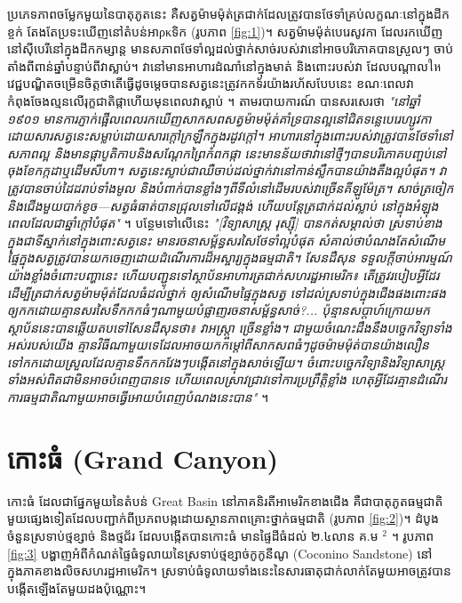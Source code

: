 \documentclass[10pt,twocolumn,letterpaper]{article}
\begin{document}
ប្រភេទភាពចម្លែកមួយនៃបាតុភូតនេះ គឺសត្វម៉ាមម៉ុត់ត្រជាក់ដែលត្រូវបានថែទាំគ្រប់លក្ខណៈនៅក្នុងដីកខ្ចក់ តែងតែប្រទះឃើញនៅតំបន់អាρκទិក (រូបភាព \ref{fig:1})។ សត្វម៉ាមម៉ុត់បេរេសូវកា ដែលរកឃើញនៅស៊ីបេរីនៅក្នុងដីកកម្សាន្ត មានសភាពថែទាំល្អដល់ថ្នាក់សាច់របស់វានៅអាចបរិភោគបានស្រួលៗ ចាប់តាំងពីពាន់ឆ្នាំបន្ទាប់ពីវាស្លាប់។ វានៅមានអាហារដំណាំនៅក្នុងមាត់ និងពោះរបស់វា ដែលបណ្ដាលให​វេជ្ជបណ្ឌិតចម្រេីនចិត្តថាតើធ្វើដូចម្តេចបានសត្វនេះត្រូវកកទ័រយ៉ាងរហ័សបែបនេះ ខណៈពេលវាកំពុងចែងល្មនលើរុក្ខជាតិផ្កាហើយមុនពេលវាស្លាប់ \cite{17}។ តាមរបាយការណ៍ បានសរសេរថា \textit{"នៅឆ្នាំ ១៩០១ មានការភ្ញាក់ផ្អើលពេលរកឃើញសាកសពសត្វម៉ាមម៉ុត់គាំទ្របានល្អនៅជិតទន្លេបេរេហ្សូវកា ដោយសារសត្វនេះសម្លាប់ដោយសារក្តៅក្រឡឹកក្នុងរដូវក្តៅ។ អាហារនៅក្នុងពោះរបស់វាត្រូវបានថែទាំនៅសភាពល្អ និងមានផ្កាបូតិកាបនិងសណ្តែកព្រៃកំពកផ្កា នេះមានន័យថាវានៅថ្មីៗបានបរិភោគបញ្ចប់នៅចុងខែកក្កដាឬដើមសីហា។ សត្វនេះស្លាប់ជាឈឺចាប់ដល់ថ្នាក់វានៅកាន់ស្លឹកបានយ៉ាងតឹងល្អបំផុត។ វាត្រូវបានចាប់ដៃដរាប់ទាំងមូល និងបំពាក់បានខ្លាំងៗពីទីលំនៅដើមរបស់វាច្រើនគីឡូម៉ែត្រ។ សាច់ត្រចៀកនិងជើងមួយបាក់ខូច—សត្វធំធាត់បានជ្រុលទៅលើជង្គង់ ហើយបន្តែត្រជាក់ដល់ស្លាប់ នៅក្នុងអំឡុងពេលដែលជាឆ្នាំក្តៅបំផុត"} \cite{18}។ បន្ថែមទៅលើនេះ \textit{"[វិទ្យាសាស្ត្រ​ រុស្ស៊ី] បានកត់សម្គាល់ថា ស្រទាប់ខាងក្នុងជាទីស្នាក់នៅក្នុងពោះសត្វនេះ មានរចនាសម្ព័ន្ធសរសៃថែទាំល្អបំផុត សំគាល់ថាបំណងតែសំណើមផ្ទៃក្នុងសត្វត្រូវបានយកចេញដោយដំណើរការដ៏អស្ចារ្យក្នុងធម្មជាតិ។ សែនដឺសុន ទទួលក្តីចាប់អារម្មណ៍យ៉ាងខ្លាំងចំពោះបញ្ហានេះ ហើយបញ្ជូនទៅស្ថាប័នអាហារត្រជាក់សហរដ្ឋអាមេរិក៖ តើត្រូវរបៀបអ្វីដែរ ដើម្បីត្រជាក់សត្វម៉ាមម៉ុត់ដែលធំដល់ថ្នាក់ ឲ្យសំណើមផ្ទៃក្នុងសត្វ ទៅដល់ស្រទាប់ក្នុងជើងផងពោះផង ឲ្យកកដោយគ្មានសរសៃទឹកកកធំៗណាមួយបំផ្លាញរចនាសម្ព័ន្ធសាច់?... ប៉ុន្មានសប្តាហ៍ក្រោយមក ស្ថាប័ននេះបានឆ្លើយតបទៅសែនដឺសុនថា៖ វាអស្ត្រា្ច ច្រើនខ្លាំង។ ជាមួយចំណេះដឹងនឹងបច្ចេកវិទ្យាទាំងអស់របស់យើង គ្មានវិធីណាមួយទេដែលអាចយកកម្ដៅពីសាកសពធំៗដូចម៉ាមម៉ុត់បានយ៉ាងលឿន ទៅកកដោយស្រួលដែលគ្មានទឹកកកវែងៗបង្កើតនៅក្នុងសាច់ឡើយ។ ចំពោះបច្ចេកវិទ្យានិងវិទ្យាសាស្ត្រទាំងអស់ពិតជាមិនអាចបំពេញបានទេ ហើយពេលស្រាវជ្រាវទៅការប្រព្រឹត្តិខ្លាំង ហេតុអ្វីដែរគ្មានដំណើរការធម្មជាតិណាមួយអាចធ្វើអោយបំពេញបំណងនេះបាន"} \cite{19}។

\section{កោះធំ (Grand Canyon)}

កោះធំ ដែលជាផ្នែកមួយនៃតំបន់ Great Basin នៅភាគនិរតីអាមេរិកខាងជើង គឺជាបាតុភូតធម្មជាតិមួយផ្សេងទៀតដែលបញ្ជាក់ពីប្រភពបង្កដោយស្ថានភាពគ្រោះថ្នាក់ធម្មជាតិ (រូបភាព \ref{fig:2})។ ដំបូង ចំនួនស្រទាប់ថ្មខ្សាច់ និងថ្មជ័រ ដែលបង្កើតបានកោះធំ មានផ្ទៃដីធំដល់ ២.៤លាន គ.ម $^2$ \cite{21}។ រូបភាព \ref{fig:3} បង្ហាញអំពីកំណត់ផ្ទៃធំទូលាយនៃស្រទាប់ថ្មខ្សាច់កូកូនីណូ (Coconino Sandstone) នៅក្នុងភាគខាងលិចសហរដ្ឋអាមេរិក។ ស្រទាប់ធំទូលាយទាំងនេះនៃសារធាតុជាក់លាក់តែមួយអាចត្រូវបានបង្កើតឡើងតែមួយដងប៉ុណ្ណោះ។
\end{document}
